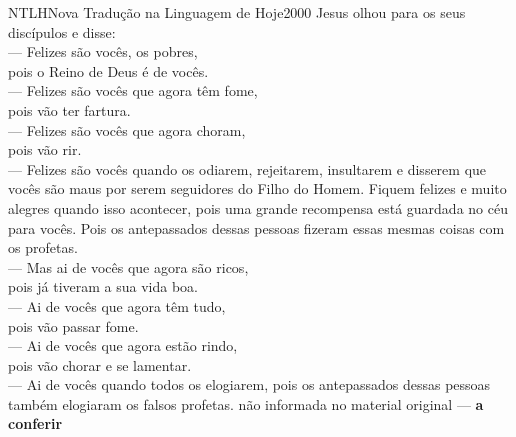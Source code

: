 \begin{traducao}{NTLH}{Nova Tradução na Linguagem de Hoje}{2000}
Jesus olhou para os seus discípulos e disse:\\
— Felizes são vocês, os pobres,\\
\quad pois o Reino de Deus é de vocês.\\
— Felizes são vocês que agora têm fome,\\
\quad pois vão ter fartura.\\
— Felizes são vocês que agora choram,\\
\quad pois vão rir.\\
— Felizes são vocês quando os odiarem, rejeitarem, insultarem e disserem
que vocês são maus por serem seguidores do Filho do Homem. Fiquem
felizes e muito alegres quando isso acontecer, pois uma grande recompensa está
guardada no céu para vocês. Pois os antepassados dessas pessoas fizeram essas
mesmas coisas com os profetas.\\
— Mas ai de vocês que agora são ricos,\\
\quad pois já tiveram a sua vida boa.\\
— Ai de vocês que agora têm tudo,\\
\quad pois vão passar fome.\\
— Ai de vocês que agora estão rindo,\\
\quad pois vão chorar e se lamentar.\\
— Ai de vocês quando todos os elogiarem, pois os antepassados dessas
pessoas também elogiaram os falsos profetas.
%
  {não informada no material original — \textbf{a conferir}}
\end{traducao}

